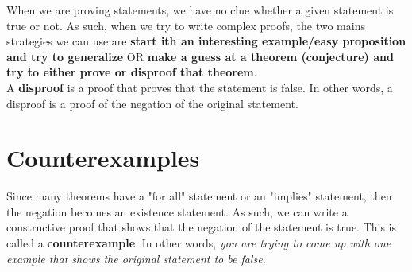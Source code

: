 When we are proving statements, we have no clue whether a given statement is true or not. As such, when we try to write complex proofs, the two mains strategies we can use are \textbf{start ith an interesting example/easy proposition and try to generalize} OR \textbf{make a guess at a theorem (conjecture) and try to either prove or disproof that theorem}.\\

A \textbf{disproof} is a proof that proves that the statement is false. In other words, a disproof is a proof of the negation of the original statement.


\section{Counterexamples}

Since many theorems have a "for all" statement or an "implies" statement, then the negation becomes an existence statement. As such, we can write a constructive proof that shows that the negation of the statement is true. This is called a \textbf{counterexample}. In other words, \textit{you are trying to come up with one example that shows the original statement to be false.}

